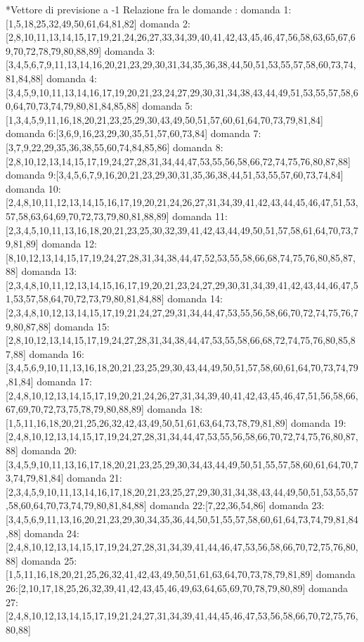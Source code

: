 *Vettore di previsione a -1
Relazione fra le domande :
domanda 1:[1,5,18,25,32,49,50,61,64,81,82]
domanda 2:[2,8,10,11,13,14,15,17,19,21,24,26,27,33,34,39,40,41,42,43,45,46,47,56,58,63,65,67,69,70,72,78,79,80,88,89]
domanda 3:[3,4,5,6,7,9,11,13,14,16,20,21,23,29,30,31,34,35,36,38,44,50,51,53,55,57,58,60,73,74,81,84,88]
domanda 4:[3,4,5,9,10,11,13,14,16,17,19,20,21,23,24,27,29,30,31,34,38,43,44,49,51,53,55,57,58,60,64,70,73,74,79,80,81,84,85,88]
domanda 5:[1,3,4,5,9,11,16,18,20,21,23,25,29,30,43,49,50,51,57,60,61,64,70,73,79,81,84]
domanda 6:[3,6,9,16,23,29,30,35,51,57,60,73,84]
domanda 7:[3,7,9,22,29,35,36,38,55,60,74,84,85,86]
domanda 8:[2,8,10,12,13,14,15,17,19,24,27,28,31,34,44,47,53,55,56,58,66,72,74,75,76,80,87,88]
domanda 9:[3,4,5,6,7,9,16,20,21,23,29,30,31,35,36,38,44,51,53,55,57,60,73,74,84]
domanda 10:[2,4,8,10,11,12,13,14,15,16,17,19,20,21,24,26,27,31,34,39,41,42,43,44,45,46,47,51,53,57,58,63,64,69,70,72,73,79,80,81,88,89]
domanda 11:[2,3,4,5,10,11,13,16,18,20,21,23,25,30,32,39,41,42,43,44,49,50,51,57,58,61,64,70,73,79,81,89]
domanda 12:[8,10,12,13,14,15,17,19,24,27,28,31,34,38,44,47,52,53,55,58,66,68,74,75,76,80,85,87,88]
domanda 13:[2,3,4,8,10,11,12,13,14,15,16,17,19,20,21,23,24,27,29,30,31,34,39,41,42,43,44,46,47,51,53,57,58,64,70,72,73,79,80,81,84,88]
domanda 14:[2,3,4,8,10,12,13,14,15,17,19,21,24,27,29,31,34,44,47,53,55,56,58,66,70,72,74,75,76,79,80,87,88]
domanda 15:[2,8,10,12,13,14,15,17,19,24,27,28,31,34,38,44,47,53,55,58,66,68,72,74,75,76,80,85,87,88]
domanda 16:[3,4,5,6,9,10,11,13,16,18,20,21,23,25,29,30,43,44,49,50,51,57,58,60,61,64,70,73,74,79,81,84]
domanda 17:[2,4,8,10,12,13,14,15,17,19,20,21,24,26,27,31,34,39,40,41,42,43,45,46,47,51,56,58,66,67,69,70,72,73,75,78,79,80,88,89]
domanda 18:[1,5,11,16,18,20,21,25,26,32,42,43,49,50,51,61,63,64,73,78,79,81,89]
domanda 19:[2,4,8,10,12,13,14,15,17,19,24,27,28,31,34,44,47,53,55,56,58,66,70,72,74,75,76,80,87,88]
domanda 20:[3,4,5,9,10,11,13,16,17,18,20,21,23,25,29,30,34,43,44,49,50,51,55,57,58,60,61,64,70,73,74,79,81,84]
domanda 21:[2,3,4,5,9,10,11,13,14,16,17,18,20,21,23,25,27,29,30,31,34,38,43,44,49,50,51,53,55,57,58,60,64,70,73,74,79,80,81,84,88]
domanda 22:[7,22,36,54,86]
domanda 23:[3,4,5,6,9,11,13,16,20,21,23,29,30,34,35,36,44,50,51,55,57,58,60,61,64,73,74,79,81,84,88]
domanda 24:[2,4,8,10,12,13,14,15,17,19,24,27,28,31,34,39,41,44,46,47,53,56,58,66,70,72,75,76,80,88]
domanda 25:[1,5,11,16,18,20,21,25,26,32,41,42,43,49,50,51,61,63,64,70,73,78,79,81,89]
domanda 26:[2,10,17,18,25,26,32,39,41,42,43,45,46,49,63,64,65,69,70,78,79,80,89]
domanda 27:[2,4,8,10,12,13,14,15,17,19,21,24,27,31,34,39,41,44,45,46,47,53,56,58,66,70,72,75,76,80,88]
